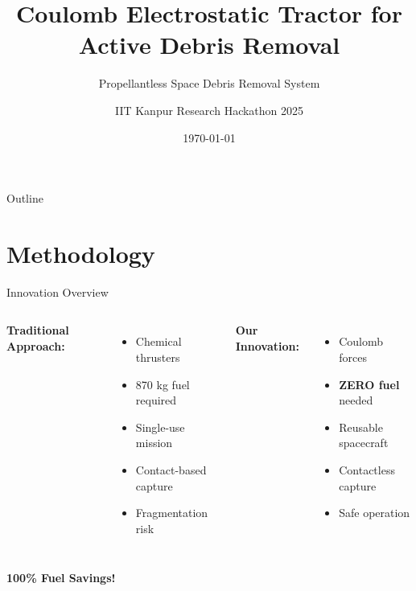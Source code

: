 \documentclass[aspectratio=169]{beamer}
\title{Coulomb Electrostatic Tractor for Active Debris Removal}
\subtitle{Propellantless Space Debris Removal System}
\author{IIT Kanpur Research Hackathon 2025}
\date{\today}
\begin{document}
\begin{frame}
\titlepage
\end{frame}

\begin{frame}{Outline}
\tableofcontents
\end{frame}

\section{Methodology}

\begin{frame}{Innovation Overview}
\begin{columns}
\textbf{Traditional Approach:}
\begin{itemize}
    \item[\color{red}\ding{55}] Chemical thrusters
    \item[\color{red}\ding{55}] 870 kg fuel required
    \item[\color{red}\ding{55}] Single-use mission
    \item[\color{red}\ding{55}] Contact-based capture
    \item[\color{red}\ding{55}] Fragmentation risk
\end{itemize}

\textbf{Our Innovation:}
\begin{itemize}
    \item[\color{green}\checkmark] Coulomb forces
    \item[\color{green}\checkmark] \textbf{ZERO fuel} needed
    \item[\color{green}\checkmark] Reusable spacecraft
    \item[\color{green}\checkmark] Contactless capture
    \item[\color{green}\checkmark] Safe operation
\end{itemize}
\end{columns}
\vspace{1em}
\begin{center}
\Large\textbf{100\% Fuel Savings!}
\end{center}
\end{frame}
\end{document}

